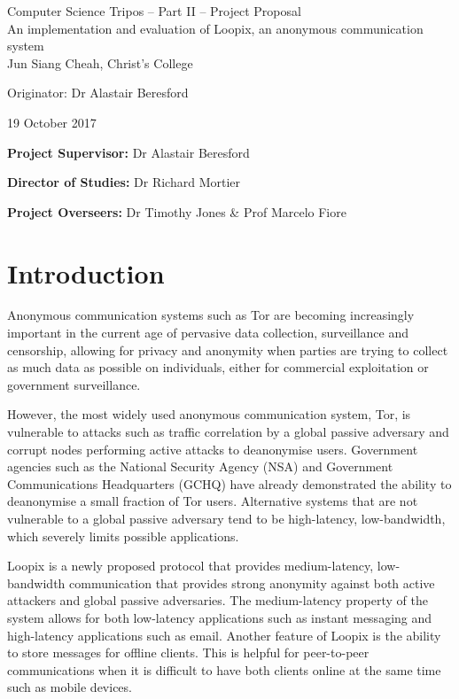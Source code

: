 \documentclass[12pt,a4paper,twoside]{article}
\begin{document}
	
	\begin{center}
		\Large
		Computer Science Tripos -- Part II -- Project Proposal\\[4mm]
		\LARGE
		An implementation and evaluation of Loopix, an anonymous communication system\\[4mm]
		
		\large
		Jun Siang Cheah, Christ's College
		
		Originator: Dr Alastair Beresford
		
		19 October 2017
	\end{center}
	
	\vspace{5mm}
	
	\textbf{Project Supervisor:} Dr Alastair Beresford
	
	\textbf{Director of Studies:} Dr Richard Mortier
	
	\textbf{Project Overseers:} Dr Timothy Jones \& Prof Marcelo Fiore 
	
	
	\section*{Introduction}
	
	Anonymous communication systems such as Tor are becoming increasingly important in the current age of pervasive data collection, surveillance and censorship, allowing for privacy and anonymity when parties are trying to collect as much data as possible on individuals, either for commercial exploitation or government surveillance.
	
	However, the most widely used anonymous communication system, Tor, is vulnerable to attacks such as traffic correlation by a global passive adversary and corrupt nodes performing active attacks to deanonymise users. Government agencies such as the National Security Agency (NSA) and Government Communications Headquarters (GCHQ) have already demonstrated the ability to deanonymise a small fraction of Tor users.\cite{torstinks} Alternative systems that are not vulnerable to a global passive adversary tend to be high-latency, low-bandwidth, which severely limits possible applications.
	
	Loopix\cite{piotrowska2017loopix} is a newly proposed protocol that provides medium-latency, low-bandwidth communication that provides strong anonymity against both active attackers and global passive adversaries. The medium-latency property of the system allows for both low-latency applications such as instant messaging and high-latency applications such as email. Another feature of Loopix is the ability to store messages for offline clients. This is helpful for peer-to-peer communications when it is difficult to have both clients online at the same time such as mobile devices.
	
\end{document}
